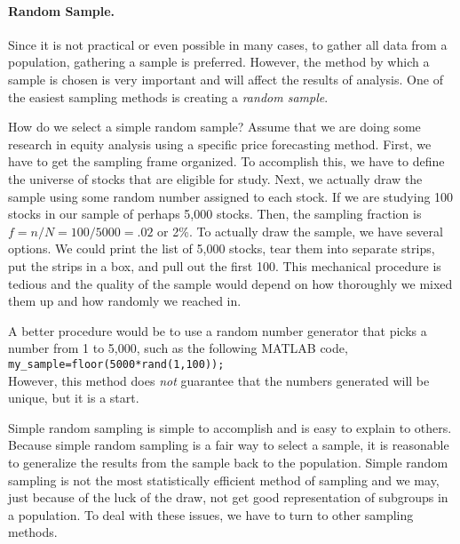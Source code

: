 \paragraph{Random Sample.}
Since it is not practical or even possible in many cases, to gather all data from a population, gathering a sample is preferred. However, the method by which a sample is chosen is very important and will affect the results of analysis. One of the easiest sampling methods is creating a \emph{random sample}.

How do we select a simple random sample? Assume that we are doing some research in equity analysis using a specific price forecasting method. First, we have to get the sampling frame organized. To accomplish this, we have to define the universe of stocks that are eligible for study. Next, we actually draw the sample using some random number assigned to each stock. If we are studying 100 stocks in our sample of perhaps 5,000 stocks. Then, the sampling fraction is $f = n/N = 100/5000 = .02$ or 2\%. To actually draw the sample, we have several options. We could print the list of 5,000 stocks, tear them into separate strips, put the strips in a box, and pull out the first 100. This mechanical procedure is tedious and the quality of the sample would depend on how thoroughly we mixed them up and how randomly we reached in.

A better procedure would be to use a random number generator that picks a number from 1 to 5,000, such as the following MATLAB code,\\

\texttt{my\_sample=floor(5000*rand(1,100));} \\

However, this method does \emph{not} guarantee that the numbers generated will be unique, but it is a start.

Simple random sampling is simple to accomplish and is easy to explain to others. Because simple random sampling is a fair way to select a sample, it is reasonable to generalize the results from the sample back to the population. Simple random sampling is not the most statistically efficient method of sampling and we may, just because of the luck of the draw, not get good representation of subgroups in a population. To deal with these issues, we have to turn to other sampling methods.


